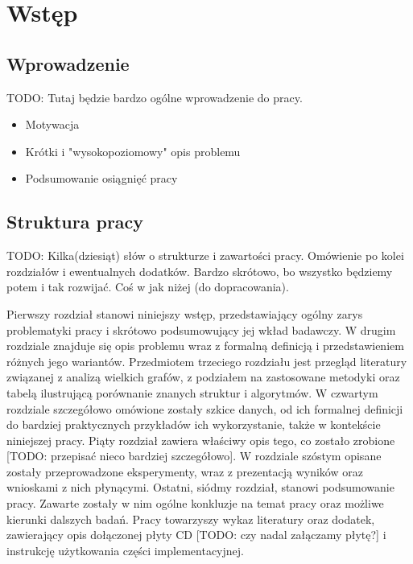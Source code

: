 \chapter{Wstęp}
\section{Wprowadzenie}

TODO: Tutaj będzie bardzo ogólne wprowadzenie do pracy.
\begin{itemize}
    \item Motywacja
    \item Krótki i "wysokopoziomowy" opis problemu
    \item Podsumowanie osiągnięć pracy
\end{itemize}

\section{Struktura pracy}
TODO: Kilka(dziesiąt) słów o strukturze i zawartości pracy. Omówienie po kolei rozdziałów i ewentualnych dodatków. Bardzo skrótowo, bo wszystko będziemy potem  i tak rozwijać. Coś w jak niżej (do dopracowania).

Pierwszy rozdział stanowi niniejszy wstęp, przedstawiający ogólny zarys problematyki pracy i skrótowo podsumowujący jej wkład badawczy. W drugim rozdziale znajduje się opis problemu wraz z formalną definicją i przedstawieniem różnych jego wariantów. Przedmiotem trzeciego rozdziału jest przegląd literatury związanej z analizą wielkich grafów, z podziałem na zastosowane metodyki oraz tabelą ilustrującą porównanie znanych struktur i algorytmów.  W czwartym rozdziale szczegółowo omówione zostały szkice danych, od ich formalnej definicji do bardziej praktycznych przykładów ich wykorzystanie, także w kontekście niniejszej pracy. Piąty rozdział zawiera właściwy opis tego, co zostało zrobione [TODO: przepisać nieco bardziej szczegółowo]. W rozdziale szóstym opisane zostały przeprowadzone eksperymenty, wraz z prezentacją wyników oraz wnioskami z nich płynącymi. Ostatni, siódmy rozdział, stanowi podsumowanie pracy. Zawarte zostały w nim ogólne konkluzje na temat pracy oraz możliwe kierunki dalszych badań. Pracy towarzyszy wykaz literatury oraz dodatek, zawierający opis dołączonej płyty CD [TODO: czy nadal załączamy płytę?] i instrukcję użytkowania części implementacyjnej. 